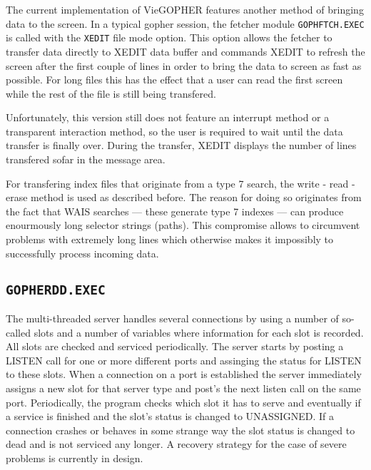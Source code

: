 \rule{0mm}{5mm}

The current implementation of VieGOPHER features another method
of bringing data to the screen.  In a typical gopher session, the
fetcher module {\tt GOPHFTCH.EXEC} is called with the {\tt XEDIT} file mode
option.  This option allows the fetcher to transfer data directly to
XEDIT data buffer and commands XEDIT to refresh the screen after the
first couple of lines in order to bring the data to screen as fast as
possible.  For long files this has the effect that a user can
read the first screen while the rest of the file is still being transfered.

Unfortunately, this version still does not feature an interrupt method
or a transparent interaction method, so the user is required to wait
until the data transfer is finally over.  During the transfer, XEDIT
displays the number of lines transfered sofar in the message area.

For transfering index files that originate from a type 7 search,
the write - read - erase method is used as described before.  The
reason for doing so originates from the fact that WAIS searches ---
these generate type 7 indexes --- can produce enourmously long
selector strings (paths).  This compromise allows to circumvent problems
with extremely long lines which otherwise makes it impossibly to
successfully process incoming data.






\subsection{{\tt GOPHERDD.EXEC}}
 
The multi-threaded server handles several connections by using a number
of so-called slots and a number of variables where information for each
slot is recorded.  All slots are checked and serviced periodically.  The
server starts by posting a LISTEN call for one or more different ports
and assinging the status for LISTEN to these slots.  When a connection
on a port is established the server immediately assigns a new slot for
that server type and post's the next listen call on the same port.
Periodically, the program checks which slot it has to serve and
eventually if a service is finished and the slot's status is changed
to UNASSIGNED.  If a connection crashes or behaves in some strange way
the slot status is changed to dead and is not serviced any longer.
A recovery strategy for the case of severe problems is currently in
design.


